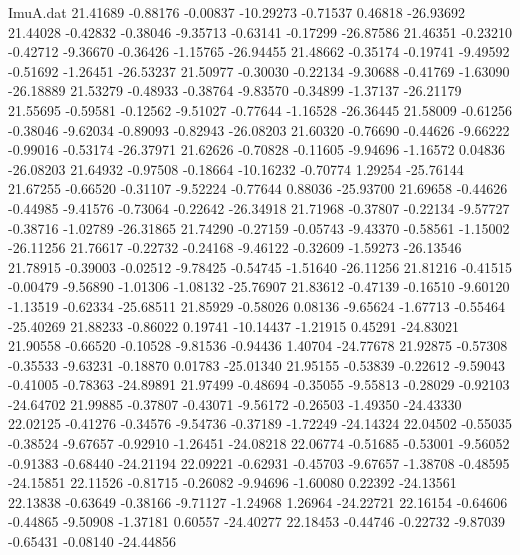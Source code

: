 \begin{filecontents}{ImuA.dat}
  21.41689   -0.88176   -0.00837  -10.29273   -0.71537    0.46818  -26.93692
  21.44028   -0.42832   -0.38046   -9.35713   -0.63141   -0.17299  -26.87586
  21.46351   -0.23210   -0.42712   -9.36670   -0.36426   -1.15765  -26.94455
  21.48662   -0.35174   -0.19741   -9.49592   -0.51692   -1.26451  -26.53237
  21.50977   -0.30030   -0.22134   -9.30688   -0.41769   -1.63090  -26.18889
  21.53279   -0.48933   -0.38764   -9.83570   -0.34899   -1.37137  -26.21179
  21.55695   -0.59581   -0.12562   -9.51027   -0.77644   -1.16528  -26.36445
  21.58009   -0.61256   -0.38046   -9.62034   -0.89093   -0.82943  -26.08203
  21.60320   -0.76690   -0.44626   -9.66222   -0.99016   -0.53174  -26.37971
  21.62626   -0.70828   -0.11605   -9.94696   -1.16572    0.04836  -26.08203
  21.64932   -0.97508   -0.18664  -10.16232   -0.70774    1.29254  -25.76144
  21.67255   -0.66520   -0.31107   -9.52224   -0.77644    0.88036  -25.93700
  21.69658   -0.44626   -0.44985   -9.41576   -0.73064   -0.22642  -26.34918
  21.71968   -0.37807   -0.22134   -9.57727   -0.38716   -1.02789  -26.31865
  21.74290   -0.27159   -0.05743   -9.43370   -0.58561   -1.15002  -26.11256
  21.76617   -0.22732   -0.24168   -9.46122   -0.32609   -1.59273  -26.13546
  21.78915   -0.39003   -0.02512   -9.78425   -0.54745   -1.51640  -26.11256
  21.81216   -0.41515   -0.00479   -9.56890   -1.01306   -1.08132  -25.76907
  21.83612   -0.47139   -0.16510   -9.60120   -1.13519   -0.62334  -25.68511
  21.85929   -0.58026    0.08136   -9.65624   -1.67713   -0.55464  -25.40269
  21.88233   -0.86022    0.19741  -10.14437   -1.21915    0.45291  -24.83021
  21.90558   -0.66520   -0.10528   -9.81536   -0.94436    1.40704  -24.77678
  21.92875   -0.57308   -0.35533   -9.63231   -0.18870    0.01783  -25.01340
  21.95155   -0.53839   -0.22612   -9.59043   -0.41005   -0.78363  -24.89891
  21.97499   -0.48694   -0.35055   -9.55813   -0.28029   -0.92103  -24.64702
  21.99885   -0.37807   -0.43071   -9.56172   -0.26503   -1.49350  -24.43330
  22.02125   -0.41276   -0.34576   -9.54736   -0.37189   -1.72249  -24.14324
  22.04502   -0.55035   -0.38524   -9.67657   -0.92910   -1.26451  -24.08218
  22.06774   -0.51685   -0.53001   -9.56052   -0.91383   -0.68440  -24.21194
  22.09221   -0.62931   -0.45703   -9.67657   -1.38708   -0.48595  -24.15851
  22.11526   -0.81715   -0.26082   -9.94696   -1.60080    0.22392  -24.13561
  22.13838   -0.63649   -0.38166   -9.71127   -1.24968    1.26964  -24.22721
  22.16154   -0.64606   -0.44865   -9.50908   -1.37181    0.60557  -24.40277
  22.18453   -0.44746   -0.22732   -9.87039   -0.65431   -0.08140  -24.44856

\end{filecontents}

